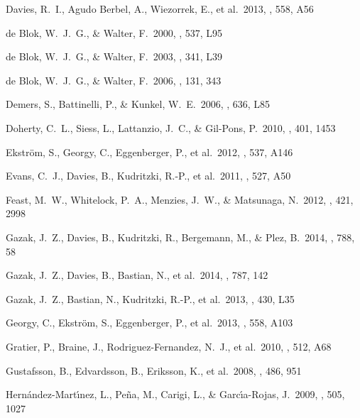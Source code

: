 \documentclass[iop]{emulateapj}
\begin{document}
\begin{thebibliography}{}
 Davies, R.~I., Agudo Berbel, A., Wiezorrek, E., et al.\ 2013, \aap, 558, A56

 de Blok, W.~J.~G., \& Walter, F.\ 2000, \apjl, 537, L95

 de Blok, W.~J.~G., \& Walter, F.\ 2003, \mnras, 341, L39

 de Blok, W.~J.~G., \& Walter, F.\ 2006, \aj, 131, 343

 Demers, S., Battinelli,
P., \& Kunkel, W.~E.\ 2006, \apjl, 636, L85

 Doherty, C.~L., Siess,
L., Lattanzio, J.~C., \& Gil-Pons, P.\ 2010, \mnras, 401, 1453

 Ekstr{\"o}m, S., Georgy, C., Eggenberger, P., et al.\ 2012, \aap, 537, A146

 Evans, C.~J., Davies, B., Kudritzki, R.-P., et al.\ 2011, \aap, 527, A50

 Feast, M.~W., Whitelock,
P.~A., Menzies, J.~W., \& Matsunaga, N.\ 2012, \mnras, 421, 2998

 Gazak, J.~Z., Davies, B.,
Kudritzki, R., Bergemann, M., \& Plez, B.\ 2014, \apj, 788, 58

 Gazak, J.~Z., Davies, B.,
Bastian, N., et al.\ 2014, \apj, 787, 142

 Gazak, J.~Z., Bastian,
N., Kudritzki, R.-P., et al.\ 2013, \mnras, 430, L35

 Georgy, C., Ekstr{\"o}m, S., Eggenberger, P., et al.\ 2013, \aap, 558, A103

 Gratier, P., Braine, J., Rodriguez-Fernandez, N.~J., et al.\ 2010, \aap, 512, A68

 Gustafsson, B., Edvardsson, B., Eriksson, K., et al.\ 2008, \aap, 486, 951

 Hern{\'a}ndez-Mart{\'{\i}}nez, L., Pe{\~n}a, M., Carigi, L., \& Garc{\'{\i}}a-Rojas, J.\ 2009, \aap, 505, 1027


\end{thebibliography}
\end{document}
